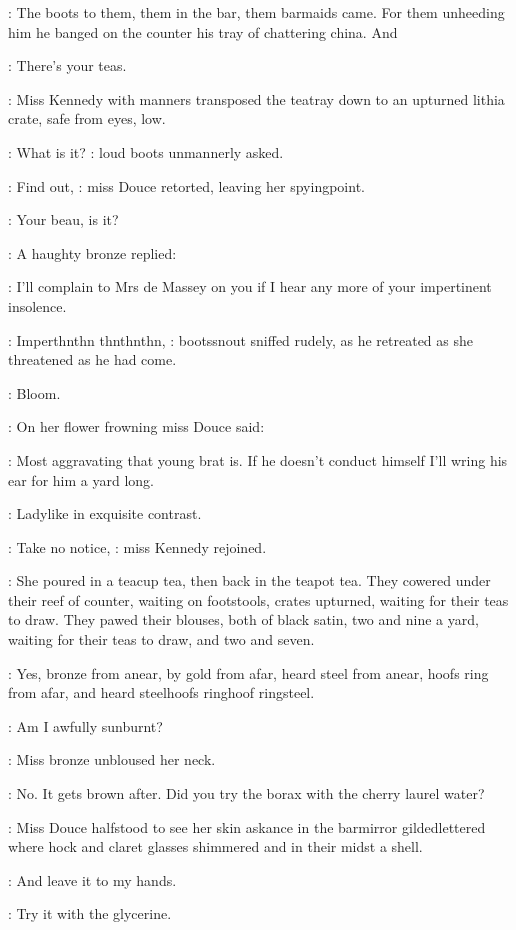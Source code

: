 :
The boots to them, them in the bar, them barmaids came. For them
unheeding him
he banged on the counter his tray of chattering china.
And

\Boots:
There's your teas.

:
Miss Kennedy with manners transposed the teatray down to an
upturned lithia crate, safe from eyes, low.

\Boots:
What is it?
:
loud boots unmannerly asked.

\MissD:
Find out,
:
miss Douce retorted, leaving her spyingpoint.

\Boots:
Your beau, is it?

:
A haughty bronze replied:

\MissD:
I'll complain to Mrs de Massey on you if I hear any more of your
impertinent insolence.

\Boots:
Imperthnthn thnthnthn,
:
bootssnout sniffed rudely,
as he retreated as she
threatened as he had come.

:
Bloom.

:
On her flower frowning miss Douce said:

\MissD:
Most aggravating that young brat is. If he doesn't conduct himself
I'll wring his ear for him a yard long.

:
Ladylike in exquisite contrast.

\MissK:
Take no notice,
:
miss Kennedy rejoined.

:
She poured in a teacup tea, then back in the teapot tea. They cowered
under their reef of counter, waiting on footstools, crates upturned,
waiting for their teas to draw.
They pawed their blouses, both of black
satin, two and nine a yard, waiting for their teas to draw, and two and
seven.

:
Yes, bronze from anear, by gold from afar, heard steel from anear,
hoofs ring from afar, and heard steelhoofs ringhoof ringsteel.

\MissD:
Am I awfully sunburnt?

:
Miss bronze unbloused her neck.

\MissK:
No. It gets brown after. Did you try the borax with
the cherry laurel water?

:
Miss Douce halfstood to see her skin askance in the barmirror
gildedlettered where hock and claret glasses shimmered and in their midst
a shell.

\MissD:
And leave it to my hands.

\MissK:
Try it with the glycerine.

